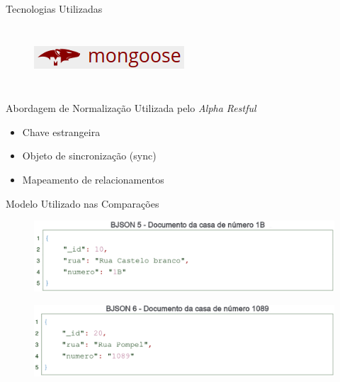 \documentclass{beamer} %
\begin{document}
\begin{frame}{Tecnologias Utilizadas}
\begin{columns}
    \begin{figure}
        \centering
        \includegraphics[width=0.9\linewidth]{imagens/mongoose.png}
        \label{fig:mongoose}
    \end{figure}
    
    \vspace{1cm}
\end{columns}
\end{frame}


\begin{frame}{Abordagem de Normalização Utilizada pelo \textit{Alpha Restful}}
    \begin{itemize}
        \item Chave estrangeira
        \item Objeto de sincronização (\alert{sync})
        \item Mapeamento de relacionamentos
    \end{itemize}
\end{frame}

\begin{frame}{Modelo Utilizado nas Comparações}
    \begin{figure}
        \centering
        \includegraphics[width=\linewidth]{imagens/casa-1b-2.png}
        \label{fig:metodologia-casa-1b}
    \end{figure}
    
    \begin{figure}
        \centering
        \includegraphics[width=\linewidth]{imagens/casa-1089-2.png}
        \label{fig:metodologia-casa-1089}
    \end{figure}
\end{frame}
\end{document}
